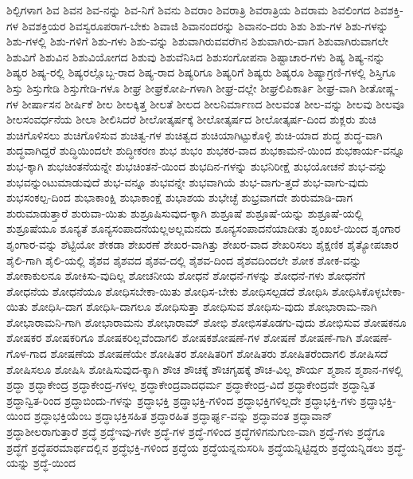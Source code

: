 {ಶಿಲ್ಪಿಗಳಾಗ
ಶಿವ
ಶಿವನ
ಶಿವ-ನನ್ನು
ಶಿವ-ನಿಗೆ
ಶಿವನು
ಶಿವರಾಂ
ಶಿವರಾತ್ರಿ
ಶಿವರಾತ್ರಿಯ
ಶಿವರಾಮ
ಶಿವಲಿಂಗದ
ಶಿವಶಕ್ತಿ-ಗಳ
ಶಿವಶಕ್ತಿಯರ
ಶಿವಸ್ವರೂಪರಾಗ-ಬೇಕು
ಶಿವಾಜಿ
ಶಿವಾನಂದರನ್ನು
ಶಿವಾನಂ-ದರು
ಶಿಶು
ಶಿಶು-ಗಳ
ಶಿಶು-ಗಳನ್ನು
ಶಿಶು-ಗಳಲ್ಲಿ
ಶಿಶು-ಗಳಿಗೆ
ಶಿಶು-ಗಳು
ಶಿಶು-ವನ್ನು
ಶಿಶುವಾಗಿರುವವರೆಗಿನ
ಶಿಶುವಾಗಿರು-ವಾಗ
ಶಿಶುವಾಗಿರುವಾಗಲೇ
ಶಿಶುವಿಗೆ
ಶಿಶುವಿನ
ಶಿಶುವಿಯೋಗದ
ಶಿಶುವು
ಶಿಶುವೆನಿಸಿದ
ಶಿಶುಸಂಗೋಪನಾ
ಶಿಷ್ಟಾಚಾರ-ಗಳು
ಶಿಷ್ಯ
ಶಿಷ್ಯ-ನನ್ನು
ಶಿಷ್ಯರ
ಶಿಷ್ಯ-ರಲ್ಲಿ
ಶಿಷ್ಯರಲ್ಲೊಬ್ಬ-ರಾದ
ಶಿಷ್ಯ-ರಾದ
ಶಿಷ್ಯರಿಗೂ
ಶಿಷ್ಯರಿಗೆ
ಶಿಷ್ಯರು
ಶಿಷ್ಯರೂ
ಶಿಷ್ಯಾಗ್ರಣಿ-ಗಳಲ್ಲಿ
ಶಿಸ್ತಿಗೂ
ಶಿಸ್ತು
ಶಿಸ್ತುಗೇಡಿ
ಶಿಸ್ತುಗೇಡಿ-ಗಳೂ
ಶೀಘ್ರ
ಶೀಘ್ರಕೋಪಿ-ಗಳಾಗಿ
ಶೀಘ್ರ-ದಲ್ಲೇ
ಶೀಘ್ರಲಿಪಿಕಾರ್ತಿ
ಶೀಘ್ರ-ವಾಗಿ
ಶೀತೋಷ್ಣ-ಗಳ
ಶೀರ್ಷಾಸನ
ಶೀರ್ಷಿಕೆ
ಶೀಲ
ಶೀಲಕ್ಕಿತ್ತ
ಶೀಲತೆ
ಶೀಲದ
ಶೀಲನಿರ್ಮಾಣದ
ಶೀಲವಂತ
ಶೀಲ-ವನ್ನು
ಶೀಲವು
ಶೀಲವೂ
ಶೀಲಸಂವರ್ಧನೆಯ
ಶೀಲಾ
ಶೀಲಿಸಿದರೆ
ಶೀಲೋತ್ಕರ್ಷಕ್ಕೆ
ಶೀಲೋತ್ಕರ್ಷದ
ಶೀಲೋತ್ಕರ್ಷ-ದಿಂದ
ಶುಕ್ಲರು
ಶುಚಿ
ಶುಚಿಗೊಳಿಸಲು
ಶುಚಿಗೊಳಿಸುವ
ಶುಚಿತ್ವ-ಗಳ
ಶುಚಿತ್ವದ
ಶುಚಿಯಾಗಿಟ್ಟುಕೊಳ್ಳಿ
ಶುಚಿ-ಯಾದ
ಶುದ್ಧ
ಶುದ್ಧ-ವಾಗಿ
ಶುದ್ಧವಾಗಿದ್ದರೆ
ಶುದ್ಧಿಯಿಂದಲೇ
ಶುದ್ಧೀಕರಣ
ಶುಭ
ಶುಭಂ
ಶುಭಕರ-ವಾದ
ಶುಭಕಾಮನೆ-ಯಿಂದ
ಶುಭಕಾರ್ಯ-ವನ್ನೂ
ಶುಭ-ಕ್ಕಾಗಿ
ಶುಭಚಿಂತನೆಯನ್ನೇ
ಶುಭಚಿಂತನೆ-ಯಿಂದ
ಶುಭದಿನ-ಗಳನ್ನು
ಶುಭನಿರೀಕ್ಷೆ
ಶುಭಯೋಚನೆ
ಶುಭ-ವನ್ನು
ಶುಭವನ್ನುಂಟುಮಾಡುವುದೆ
ಶುಭ-ವನ್ನೂ
ಶುಭವನ್ನೇ
ಶುಭವಾಗಿಯೆ
ಶುಭ-ವಾಗು-ತ್ತದೆ
ಶುಭ-ವಾಗು-ವುದು
ಶುಭಸಂಕಲ್ಪ-ದಿಂದ
ಶುಭಾಕಾಂಕ್ಷಿ
ಶುಭಾಕಾಂಕ್ಷೆ
ಶುಭಾಶಯ
ಶುಭೇಚ್ಛೆ
ಶುಭ್ರವಾಗದೇ
ಶುರುಮಾಡಿ-ದಾಗ
ಶುರುಮಾಡುತ್ತಾರೆ
ಶುರುವಾ-ಯಿತು
ಶುಶ್ರೂಷಿಸುವುದ-ಕ್ಕಾಗಿ
ಶುಶ್ರೂಷೆ
ಶುಶ್ರೂಷೆ-ಯನ್ನು
ಶುಶ್ರೂಷೆ-ಯಲ್ಲಿ
ಶುಶ್ರೂಷೆಯೂ
ಶೂನ್ಯತೆ
ಶೂನ್ಯಸಂಪಾದನೆಯಲ್ಲಅಲ್ಲಮನದು
ಶೂನ್ಯಸಂಪಾದನೆಯಾದೀತು
ಶೃಂಖಲೆ-ಯಿಂದ
ಶೃಂಗಾರ
ಶೃಂಗಾರ-ವನ್ನು
ಶೆಟ್ಟಿಯೋ
ಶೇಕಡಾ
ಶೇಖರಣೆ
ಶೇಖರ-ವಾಗಿತ್ತು
ಶೇಖರ-ವಾದ
ಶೇಖರಿಸಲು
ಶೈಕ್ಷಣಿಕ
ಶೈತ್ಯೋಪಚಾರ
ಶೈಲಿ-ಗಾಗಿ
ಶೈಲಿ-ಯಲ್ಲಿ
ಶೈಶವ
ಶೈಶವದ
ಶೈಶವ-ದಲ್ಲಿ
ಶೈಶವ-ದಿಂದ
ಶೈಶವದಿಂದಲೇ
ಶೋಕ
ಶೋಕ-ವನ್ನು
ಶೋಕಾಕುಲನೂ
ಶೋಕಿಸು-ವುದಿಲ್ಲ
ಶೋಚನೀಯ
ಶೋಧನೆ
ಶೋಧನೆ-ಗಳನ್ನು
ಶೋಧನೆ-ಗಳು
ಶೋಧನೆಗೆ
ಶೋಧನೆಯ
ಶೋಧನೆಯೂ
ಶೋಧಿಸಬೇಕಾ-ಯಿತು
ಶೋಧಿಸ-ಬೇಕು
ಶೋಧಿಸಲ್ಪಡದೆ
ಶೋಧಿಸಿ
ಶೋಧಿಸಿಕೊಳ್ಳಬೇಕಾ-ಯಿತು
ಶೋಧಿಸಿ-ದಾಗ
ಶೋಧಿಸಿ-ದಾಗಲೂ
ಶೋಧಿಸುತ್ತಾ
ಶೋಧಿಸುವ
ಶೋಧಿಸು-ವುದು
ಶೋಭಾರಾಮ-ನಾಗಿ
ಶೋಭಾರಾಮನಿ-ಗಾಗಿ
ಶೋಭಾರಾಮನು
ಶೋಭಾರಾಮ್
ಶೋಭಿ
ಶೋಭಿಸತೊಡಗು-ವುದು
ಶೋಭಿಸುವ
ಶೋಷಕನೂ
ಶೋಷಕರ
ಶೋಷಕರಿಗೂ
ಶೋಷಕರಿಲ್ಲವೆಂದಾಗಲಿ
ಶೋಷಕಶೋಷಣೆ-ಗಳ
ಶೋಷಣೆ
ಶೋಷಣೆ-ಗಾಗಿ
ಶೋಷಣೆ-ಗೊಳ-ಗಾದ
ಶೋಷಣೆಯ
ಶೋಷಣೆಯೇ
ಶೋಷಿತರ
ಶೋಷಿತರಿಗೆ
ಶೋಷಿತರು
ಶೋಷಿತರೆಂದಾಗಲಿ
ಶೋಷಿಸದೆ
ಶೋಷಿಸಲೂ
ಶೋಷಿಸಿ
ಶೋಷಿಸುವುದ-ಕ್ಕಾಗಿ
ಶೌಚ
ಶೌಚಕ್ಕೆ
ಶೌಚಗೃಹಕ್ಕೆ
ಶೌಚ-ವಿಲ್ಲ
ಶೌರ್ಯ
ಶ್ಮಶಾನ
ಶ್ಮಶಾನ-ಗಳಲ್ಲಿ
ಶ್ರದ್ಧಾ
ಶ್ರದ್ಧಾಕೇಂದ್ರ
ಶ್ರದ್ಧಾಕೇಂದ್ರ-ಗಳಲ್ಲ
ಶ್ರದ್ಧಾಕೇಂದ್ರವಾದಧರ್ಮ
ಶ್ರದ್ಧಾಕೇಂದ್ರ-ವಿದೆ
ಶ್ರದ್ಧಾಕೇಂದ್ರವೇ
ಶ್ರದ್ಧಾನ್ವಿತ
ಶ್ರದ್ಧಾನ್ವಿತ-ರಿಂದ
ಶ್ರದ್ಧಾಬಿಂದು-ಗಳನ್ನು
ಶ್ರದ್ಧಾಭಕ್ತಿ
ಶ್ರದ್ಧಾಭಕ್ತಿ-ಗಳಿಂದ
ಶ್ರದ್ಧಾಭಕ್ತಿಗಳಿಲ್ಲದೇ
ಶ್ರದ್ಧಾಭಕ್ತಿ-ಗಳು
ಶ್ರದ್ಧಾಭಕ್ತಿ-ಯಿಂದ
ಶ್ರದ್ಧಾಭಕ್ತಿಯೆಂಬ
ಶ್ರದ್ಧಾಭಕ್ತಿಸಹಿತ
ಶ್ರದ್ಧಾರಹಿತ
ಶ್ರದ್ಧಾರ್ಘ್ಯ-ವನ್ನು
ಶ್ರದ್ಧಾವಂತ
ಶ್ರದ್ಧಾವಾನ್
ಶ್ರದ್ಧಾಶೀಲರಾಗುತ್ತಾರೆ
ಶ್ರದ್ಧೆ
ಶ್ರದ್ಧೆಇವು-ಗಳೇ
ಶ್ರದ್ಧೆ-ಗಳ
ಶ್ರದ್ಧೆ-ಗಳಿಂದ
ಶ್ರದ್ಧೆಗಳಿಗನುಗುಣ-ವಾಗಿ
ಶ್ರದ್ಧೆ-ಗಳು
ಶ್ರದ್ಧೆಗೂ
ಶ್ರದ್ಧೆಗೆ
ಶ್ರದ್ಧೆಪರಮಾರ್ಥದಲ್ಲಿನ
ಶ್ರದ್ಧೆಭಕ್ತಿ-ಗಳಿಂದ
ಶ್ರದ್ಧೆಯ
ಶ್ರದ್ಧೆಯನ್ನನುಸರಿಸಿ
ಶ್ರದ್ಧೆಯನ್ನಿಟ್ಟಿದ್ದರು
ಶ್ರದ್ಧೆಯನ್ನಿಡಲು
ಶ್ರದ್ಧೆ-ಯನ್ನು
ಶ್ರದ್ಧೆ-ಯಿಂದ
}
